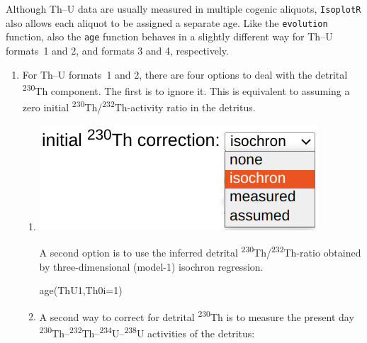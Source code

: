 \begin{refsection}
Although Th--U data are usually measured in multiple cogenic aliquots,
\texttt{IsoplotR} also allows each aliquot to be assigned a separate
age. Like the \texttt{evolution} function, also the \texttt{age}
function behaves in a slightly different way for Th--U formats~1 and
2, and formats 3 and 4, respectively.

\begin{enumerate}

\item For Th--U formats~1 and 2, there are four options to deal with
  the detrital \textsuperscript{230}Th component. The first is to
  ignore it. This is equivalent to assuming a zero initial
  \textsuperscript{230}Th/\textsuperscript{232}Th-activity ratio in
  the detritus.

  \begin{enumerate}
  
  \item \begin{minipage}[t]{.4\linewidth}
    \strut\vspace*{-\baselineskip}\newline
    \includegraphics[width=\linewidth]{../figures/ThUdetritalisochroncorr.png}
  \end{minipage}
    \begin{minipage}[t]{.6\linewidth}
      A second option is to use the inferred detrital
      \textsuperscript{230}Th/\textsuperscript{232}Th-ratio obtained
      by three-dimensional (model-1) isochron regression.
    \end{minipage}

\begin{console}
age(ThU1,Th0i=1)
\end{console}

\item A second way to correct for detrital \textsuperscript{230}Th is
  to measure the present day
  \textsuperscript{230}Th--\textsuperscript{232}Th--\textsuperscript{234}U--\textsuperscript{238}U
  activities of the detritus:\\


\end{enumerate}
\end{enumerate}
\end{refsection}
